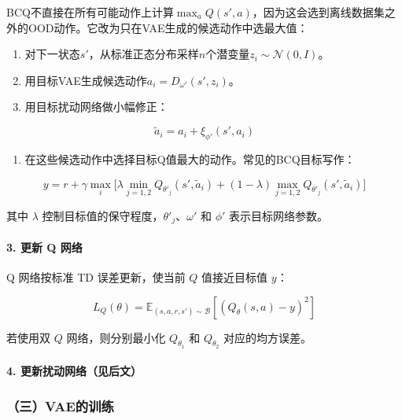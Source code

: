 BCQ不直接在所有可能动作上计算\(\max_a Q(s',a)\)，因为这会选到离线数据集之外的OOD动作。它改为只在VAE生成的候选动作中选最大值：

\begin{enumerate}
\def\labelenumi{\arabic{enumi}.}
\tightlist
\item
  对下一状态\(s'\)，从标准正态分布采样\(n\)个潜变量\(z_i \sim \mathcal{N}(0,I)\)。
\item
  用目标VAE生成候选动作\(a_i = D_{\omega'}(s',z_i)\)。
\item
{}
  用目标扰动网络做小幅修正：
\end{enumerate}

\[
\tilde a_i = a_i + \xi_{\phi'}(s',a_i)
\]

\begin{enumerate}
\def\labelenumi{\arabic{enumi}.}
\setcounter{enumi}{3}
\tightlist
\item
{}
  在这些候选动作中选择目标Q值最大的动作。常见的BCQ目标写作：
\end{enumerate}

\[
y = r + \gamma \max_i \bigl[
\lambda \min_{j=1,2} Q_{\theta'_j}(s', \tilde a_i)
+ (1-\lambda) \max_{j=1,2} Q_{\theta'_j}(s', \tilde a_i)
\bigr]
\]

其中 \(\lambda\) 控制目标值的保守程度，\(\theta'_j\)、\(\omega'\) 和 \(\phi'\) 表示目标网络参数。

\hypertarget{ux66f4ux65b0-q-ux7f51ux7edc}{%
\paragraph{3. 更新 Q 网络}\label{ux66f4ux65b0-q-ux7f51ux7edc}}

Q 网络按标准 TD 误差更新，使当前 \(Q\) 值接近目标值 \(y\)：

\[
L_Q(\theta)=\mathbb{E}_{(s,a,r,s')\sim\mathcal B}
[(Q_\theta(s,a)-y)^{2}]
\]

若使用双 \(Q\) 网络，则分别最小化 \(Q_{\theta_1}\) 和 \(Q_{\theta_2}\) 对应的均方误差。

\hypertarget{ux66f4ux65b0ux6270ux52a8ux7f51ux7edcux89c1ux540eux6587}{%
\paragraph{4. 更新扰动网络（见后文）}\label{ux66f4ux65b0ux6270ux52a8ux7f51ux7edcux89c1ux540eux6587}}

\hypertarget{ux4e09vaeux7684ux8badux7ec3}{%
\subsubsection{（三）VAE的训练}\label{ux4e09vaeux7684ux8badux7ec3}}

